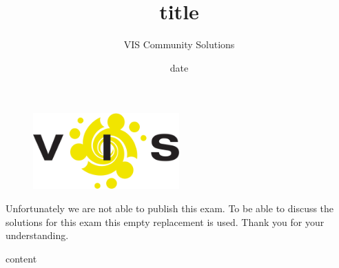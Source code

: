 \documentclass{scrartcl}
\title{{{title}}}
\author{VIS Community Solutions}
\date{{{date}}}
\begin{document}
\maketitle
\begin{figure}[htbp]
  \centering
  \includegraphics[width=0.5\textwidth]{vis_logo}
\end{figure}

\vspace{3cm}

Unfortunately we are not able to publish this exam. To be able to discuss the solutions for this exam this empty replacement is used. Thank you for your understanding.

\clearpage

{{content}}
\end{document}
